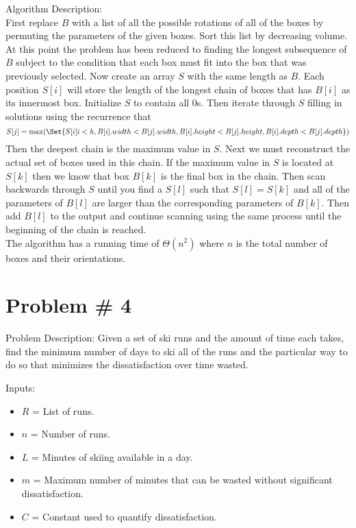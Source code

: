 \documentclass{article}
\providecommand\given{} %
\begin{document}
Algorithm Description:\\
First replace $B$ with a list of all the possible rotations of all of the boxes by permuting the parameters of the given boxes. Sort this list by decreasing volume. At this point the problem has been reduced to finding the longest subsequence of $B$ subject to the condition that each box must fit into the box that was previously selected. Now create an array $S$ with the same length as $B$. Each position $S[i]$ will store the length of the longest chain of boxes that has $B[i]$ as its innermost box. Initialize $S$ to contain all 0s. Then iterate through $S$ filling in solutions using the recurrence that
$$S[j] =   \max(\Set{S[i] \given i<h, B[i].width < B[j].width, B[i].height < B[j].height, B[i].depth < B[j].depth})$$
Then the deepest chain is the maximum value in $S$. Next we must reconstruct the actual set of boxes used in this chain. If the maximum value in $S$ is located at $S[k]$ then we know that box $B[k]$ is the final box in the chain. Then scan backwards through $S$ until you find a $S[l]$ such that $S[l] = S[k]$ and all of the parameters of $B[l]$ are larger than the corresponding parameters of $B[k]$. Then add $B[l]$ to the output and continue scanning using the same process until the beginning of the chain is reached.\\

The algorithm has a running time of $\Theta(n^2)$ where $n$ is the total number of boxes and their orientations.

\section*{Problem \# 4}
Problem Description: Given a set of ski runs and the amount of time each takes, find the minimum number of days to ski all of the runs and the particular way to do so that minimizes the dissatisfaction over time wasted.

Inputs:
\begin{itemize}
    \item $R$ = List of runs.
    \item $n$ = Number of runs.
    \item $L$ = Minutes of skiing available in a day.
    \item $m$ = Maximum number of minutes that can be wasted without significant dissatisfaction.
    \item $C$ = Constant used to quantify dissatisfaction. 
\end{itemize}
\end{document}
